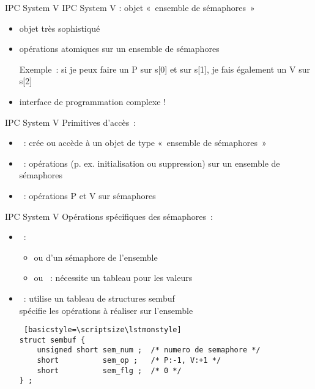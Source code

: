 
\begin {frame} {IPC System V}
    IPC System V : objet «~ensemble de sémaphores~»

    \vspace* {3mm}

    \begin {itemize}
	\item objet très sophistiqué
	\item opérations atomiques sur un ensemble de sémaphores

	    Exemple~: si je peux faire un P sur s[0] et sur s[1],
	    je fais également un V sur s[2]

	\item \implique interface de programmation complexe !
    \end {itemize}

\end {frame}

\begin {frame} {IPC System V}
    Primitives d'accès~:

    \begin {itemize}
	\item {}~: crée ou accède à un objet de type
	    «~ensemble de sémaphores~»
	\item {}~: opérations (p. ex. initialisation ou
	    suppression) sur un ensemble de sémaphores

	    \vspace* {3mm}

	\item {}~: opérations P et V sur sémaphores
    \end {itemize}

\end {frame}


\begin {frame} [fragile] {IPC System V}
    Opérations spécifiques des sémaphores~:
    \begin {itemize}
	\item {}~:
	    \begin {itemize}
		\item {} ou  d'un
		    sémaphore de l'ensemble
		\item {} ou ~: nécessite
		    un tableau pour les valeurs
	    \end {itemize}
	\item {}~: utilise un tableau de structures \code
	    {sembuf} \\
	    \implique spécifie les opérations à réaliser sur l'ensemble

\begin {lstlisting} [basicstyle=\scriptsize\lstmonstyle]
struct sembuf {
    unsigned short sem_num ;  /* numero de semaphore */
    short          sem_op ;   /* P:-1, V:+1 */
    short          sem_flg ;  /* 0 */
} ;
\end{lstlisting}

    \end {itemize}

\end{frame}

